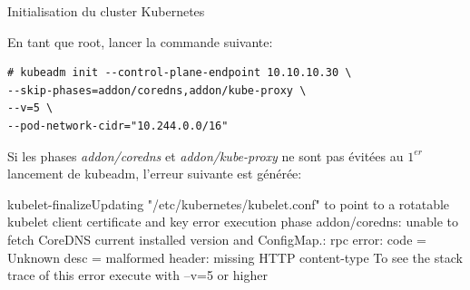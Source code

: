 \begin{frame}[fragile]{Initialisation du cluster Kubernetes}

En tant que root, lancer la commande suivante:

\begin{tiny}
\begin{Verbatim}[commandchars=\&\@\@]
# kubeadm init --control-plane-endpoint 10.10.10.30 \
--skip-phases=addon/coredns,addon/kube-proxy \
--v=5 \
--pod-network-cidr="10.244.0.0/16"
\end{Verbatim}
\end{tiny}

Si les phases \textit{addon/coredns} et \textit{addon/kube-proxy} ne sont pas évitées au $1^{er}$ lancement de kubeadm, l'erreur suivante est générée:

\begin{tiny}
\begin{tcolorbox}
\lbrack kubelet-finalize\rbrack Updating "/etc/kubernetes/kubelet.conf" to point to a rotatable kubelet client certificate and key
error execution phase addon/coredns: unable to fetch CoreDNS current installed version and ConfigMap.: rpc error: code = Unknown desc = malformed header: missing HTTP content-type
To see the stack trace of this error execute with --v=5 or higher
\end{tcolorbox}
\end{tiny}

\end{frame}


